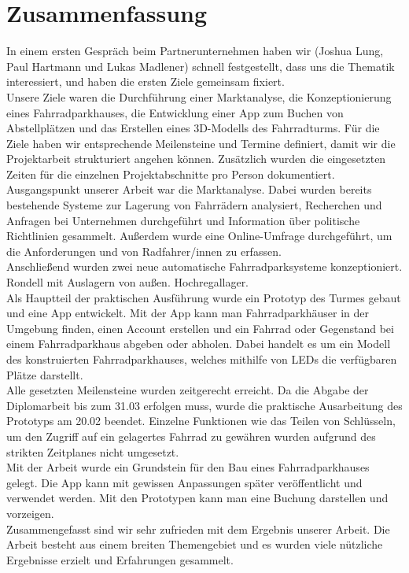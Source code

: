 \section{Zusammenfassung}

In einem ersten Gespräch beim Partnerunternehmen haben wir (Joshua Lung, Paul Hartmann und Lukas Madlener) schnell festgestellt, dass uns die Thematik interessiert, und haben die ersten Ziele gemeinsam fixiert. \\
Unsere Ziele waren die Durchführung einer Marktanalyse, die Konzeptionierung eines Fahrradparkhauses, die Entwicklung einer App zum Buchen von Abstellplätzen und das Erstellen eines 3D-Modells des Fahrradturms. Für die Ziele haben wir entsprechende Meilensteine und Termine definiert, damit wir die Projektarbeit strukturiert angehen können. Zusätzlich wurden die eingesetzten Zeiten für die einzelnen Projektabschnitte pro Person dokumentiert.\\

Ausgangspunkt unserer Arbeit war die Marktanalyse. Dabei wurden bereits bestehende Systeme zur Lagerung von Fahrrädern analysiert, Recherchen und Anfragen bei Unternehmen durchgeführt und Information über politische Richtlinien gesammelt. Außerdem wurde eine Online-Umfrage durchgeführt, um die Anforderungen und von Radfahrer/innen zu erfassen.\\
Anschließend wurden zwei neue automatische Fahrradparksysteme konzeptioniert. Rondell mit Auslagern von außen. Hochregallager.\\
Als Hauptteil der praktischen Ausführung wurde ein Prototyp des Turmes gebaut und eine App entwickelt. Mit der App kann man Fahrradparkhäuser in der Umgebung finden, einen Account erstellen und ein Fahrrad oder Gegenstand bei einem Fahrradparkhaus abgeben oder abholen. Dabei handelt es um ein Modell des konstruierten Fahrradparkhauses, welches mithilfe von LEDs die verfügbaren Plätze darstellt. \\
Alle gesetzten Meilensteine wurden zeitgerecht erreicht. Da die Abgabe der Diplomarbeit bis zum 31.03 erfolgen muss, wurde die praktische Ausarbeitung des Prototyps am 20.02 beendet. Einzelne Funktionen wie das Teilen von Schlüsseln, um den Zugriff auf ein gelagertes Fahrrad zu gewähren wurden aufgrund des strikten Zeitplanes nicht umgesetzt.\\

Mit der Arbeit wurde ein Grundstein für den Bau eines Fahrradparkhauses gelegt. Die App kann mit gewissen Anpassungen später veröffentlicht und verwendet werden. Mit den Prototypen kann man eine Buchung darstellen und vorzeigen.\\
Zusammengefasst sind wir sehr zufrieden mit dem Ergebnis unserer Arbeit. Die Arbeit besteht aus einem breiten Themengebiet und es wurden viele nützliche Ergebnisse erzielt und Erfahrungen gesammelt.
